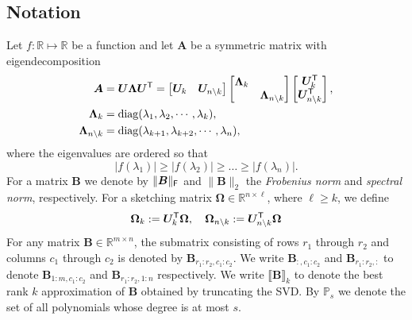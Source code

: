 \subsection{Notation}
Let $f: \mathbb{R} \mapsto \mathbb{R}$ be a function and let $\bm{A}$ be a symmetric matrix with eigendecomposition
\begin{align}\label{eq:A}
    \begin{split}
    \bm{A} &= \bm{U} \bm{\Lambda} \bm{U}^{\textsf{\textup{T}}} = \begin{bmatrix} \bm{U}_k & \bm{U}_{n \setminus k} \end{bmatrix} \begin{bmatrix} \bm{\Lambda}_k & \\ & \bm{\Lambda}_{n \setminus k} \end{bmatrix} \begin{bmatrix} \bm{U}_k^{\textsf{\textup{T}}} \\ \bm{U}_{n\setminus k}^{\textsf{\textup{T}}} \end{bmatrix}, \\
     \bm{\Lambda}_k &= \operatorname{diag}(\lambda_1,\lambda_2,\cdots,\lambda_k),\\
     \bm{\Lambda}_{n \setminus k} &= \operatorname{diag}(\lambda_{k+1},\lambda_{k+2},\cdots,\lambda_n),
     \end{split}
\end{align}
where the eigenvalues are ordered so that 
\begin{equation*}
|f(\lambda_1)| \geq |f(\lambda_2)| \geq \ldots \geq |f(\lambda_n)|.
\end{equation*}
For a matrix $\bm{B}$ we denote by $\|\bm{B}\|_{\textsf{\textup{F}}}$ and $\|\bm{B}\|_2$ the \emph{Frobenius norm} and \emph{spectral norm}, respectively. 
For a sketching matrix $\bm{\Omega} \in \mathbb{R}^{n \times \ell}$, where $\ell \geq k$, we define
\begin{equation}\label{eq:omega_partition}
    \bm{\Omega}_k := \bm{U}_k^{\textsf{\textup{T}}} \bm{\Omega}, \quad \bm{\Omega}_{n\setminus k} := \bm{U}_{n\setminus k}^{\textsf{\textup{T}}} \bm{\Omega}
\end{equation}
For any matrix $\bm{B} \in \mathbb{R}^{m \times n}$, the submatrix consisting of rows $r_1$ through $r_2$ and columns $c_1$ through $c_2$ is denoted by $\bm{B}_{r_1:r_2,c_1:c_2}$. We write $\bm{B}_{:,c_1:c_2}$ and $\bm{B}_{r_1:r_2,:}$ to denote $\bm{B}_{1:m,c_1:c_2}$ and $\bm{B}_{r_1:r_2,1:n}$ respectively. We write $\llbracket \bm{B} \rrbracket_k$ to denote the best rank $k$ approximation of $\bm{B}$ obtained by truncating the SVD. By $\mathbb{P}_s$ we denote the set of all polynomials whose degree is at most $s$. %
